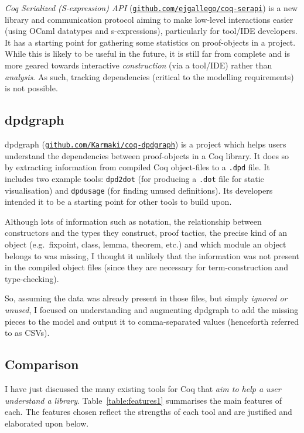 \emph{Coq Serialized (S-expression) API}
(\href{http://github.com/ejgallego/coq-serapi}{\texttt{github.com/ejgallego/coq-serapi}})
is a new library and communication protocol aiming to make low-level
interactions easier (using OCaml datatypes and s-expressions), particularly for
tool/IDE developers. It has a starting point for gathering some statistics on
proof-objects in a project. While this is likely to be useful in the future, it
is still far from complete and is more geared towards interactive
\emph{construction} (via a tool/IDE) rather than \emph{analysis}. As such,
tracking dependencies (critical to the modelling requirements) is not possible.

\subsection{dpdgraph}

dpdgraph
(\href{http://github.com/Karmaki/coq-dpdgraph}{\texttt{github.com/Karmaki/coq-dpdgraph}})
is a project which helps users understand the dependencies between proof-objects
in a Coq library. It does so by extracting information from compiled Coq
object-files to a \texttt{.dpd} file. It includes two example tools:
\texttt{dpd2dot} (for producing a \texttt{.dot} file for static visualisation)
and \texttt{dpdusage} (for finding unused definitions). Its developers intended
it to be a starting point for other tools to build upon.

Although lots of information such as notation, the relationship between
constructors and the types they construct, proof tactics, the precise kind of an
object (e.g.\  fixpoint, class, lemma, theorem, etc.) and which module an object
belongs to was missing, I thought it unlikely that the information was not
present in the compiled object files (since they are necessary for
term-construction and type-checking).

So, assuming the data was already present in those files, but simply
\emph{ignored or unused}, I focused on understanding and augmenting dpdgraph to
add the missing pieces to the model and output it to comma-separated values
(henceforth referred to as CSVs).

\subsection{Comparison}\label{subsec:comparison}

I have just discussed the many existing tools for Coq that \emph{aim to help a
user understand a library}. Table~\ref{table:features1} summarises the main
features of each. The features chosen reflect the strengths of each tool
and are justified and elaborated upon below. 

